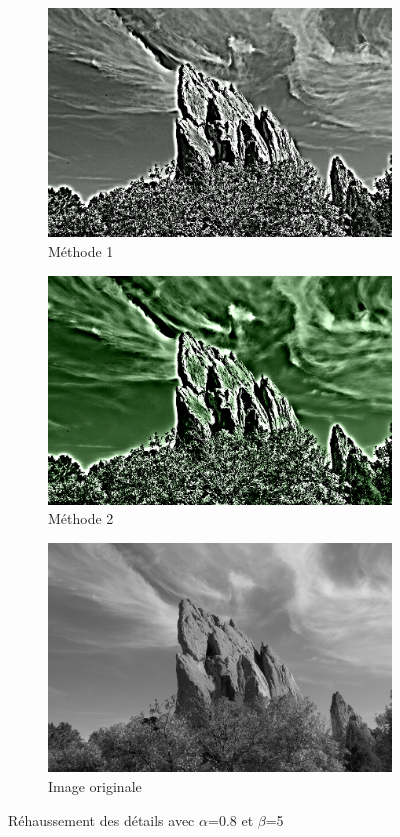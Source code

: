 \documentclass[twoside,UTF8]{EPURapport}
\begin{document}
\begin{figure}
        \centering
        \begin{subfigure}[b]{0.3\textwidth}
                \includegraphics[scale=0.4]{images/rock_input1_08_5.png} 
                \caption{Méthode 1}
        \end{subfigure}
        \qquad \qquad
        \begin{subfigure}[b]{0.3\textwidth}
                \includegraphics[scale=0.4]{images/rock_input2_08_5.png}
                \caption{Méthode 2}
        \end{subfigure}
        
        \begin{subfigure}[b]{0.3\textwidth}
                \includegraphics[scale=0.4]{images/rock_input.png}
             	\caption{Image originale}
        \end{subfigure}
        \caption{Réhaussement des détails avec $\alpha$=0.8 et $\beta$=5 }
\end{figure}
\end{document}
